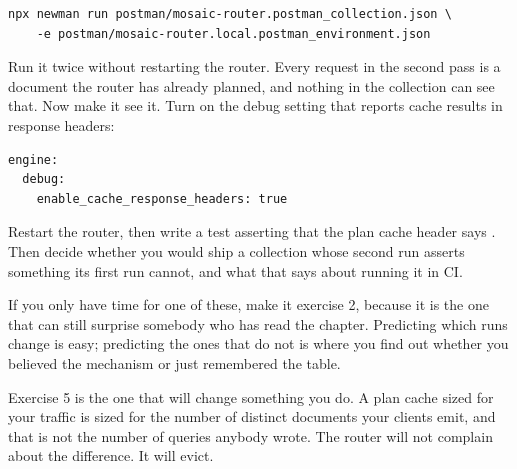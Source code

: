 \begin{enumerate}
  \begin{verbatim}
npx newman run postman/mosaic-router.postman_collection.json \
    -e postman/mosaic-router.local.postman_environment.json
  \end{verbatim}

  Run it twice without restarting the router. Every request in the second pass
  is a document the router has already planned, and nothing in the collection
  can see that. Now make it see it. Turn on the debug setting that reports cache
  results in response headers:

  \begin{verbatim}
engine:
  debug:
    enable_cache_response_headers: true
  \end{verbatim}

  Restart the router, then write a test asserting that the plan cache header
  says \code{HIT}. Then decide whether you would ship a collection whose second
  run asserts something its first run cannot, and what that says about running
  it in CI.
\end{enumerate}

If you only have time for one of these, make it exercise 2, because it is the
one that can still surprise somebody who has read the chapter. Predicting which
runs change is easy; predicting the ones that do not is where you find out
whether you believed the mechanism or just remembered the table.

Exercise 5 is the one that will change something you do. A plan cache sized for
your traffic is sized for the number of distinct documents your clients emit,
and that is not the number of queries anybody wrote. The router will not
complain about the difference. It will evict.
